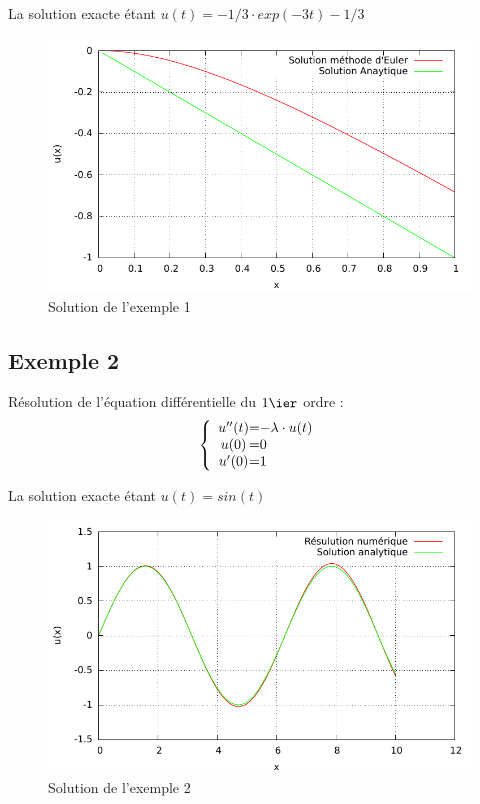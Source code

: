 \documentclass[a4paper,11pt]{article}
\begin{document}
La solution exacte étant $u(t)=-1/3\cdot exp(-3t)-1/3$
  \begin{figure}[H]
	 \begin{center}
	\includegraphics[scale=.8]{exemple1}
	\caption{Solution de l'exemple 1}
	\end{center}
      \end{figure}
\subsection{Exemple 2}
Résolution de l'équation différentielle du $1\ier$ ordre :
\begin{equation*}
 \left \{
  \begin{array}{c @{=} l}
    u''(t) & -\lambda \cdot u(t) 
\\
   u(0) & 0
\\
  u'(0)&1
  \end{array}
\right.
\end{equation*} 

La solution exacte étant $u(t)=sin(t)$

  \begin{figure}[H]
	 \begin{center}
	\includegraphics[scale=1]{exemple2}
	\caption{Solution de l'exemple 2}
	\end{center}
      \end{figure}
\end{document}

